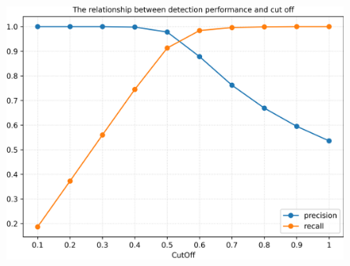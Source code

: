 \documentclass[fontset=macnew,UTF8]{article} %
\begin{document}
\begin{figure}[h!]
{\begin{minipage}[b]{.3\linewidth}
			\includegraphics[scale=0.28]{./Backdoor_detect_result/detect/IAD.png}
		\end{minipage}
	}
	

\end{figure}
\end{document}
